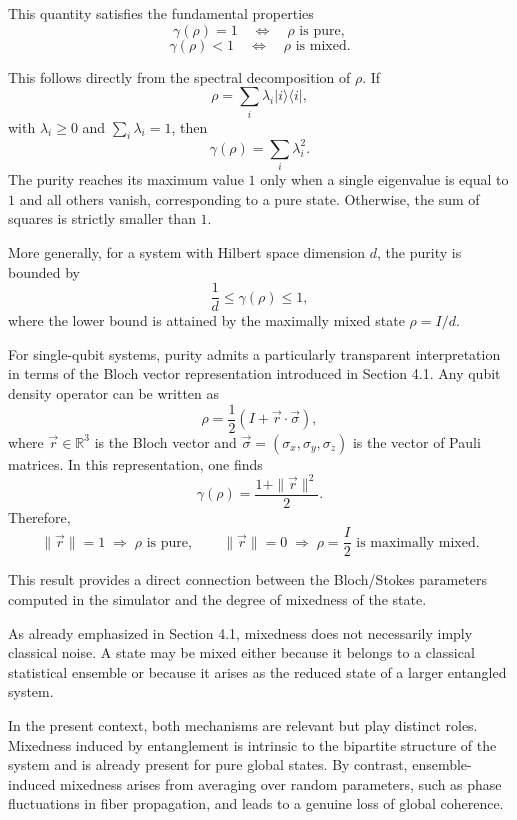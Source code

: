 \documentclass[a4paper]{article}
\begin{document}
This quantity satisfies the fundamental properties
\[
\gamma(\rho) = 1 \quad \Longleftrightarrow \quad \rho \text{ is pure},
\]
\[
\gamma(\rho) < 1 \quad \Longleftrightarrow \quad \rho \text{ is mixed}.
\]

This follows directly from the spectral decomposition of $\rho$. If
\[
\rho = \sum_i \lambda_i |i\rangle \langle i|,
\]
with $\lambda_i \ge 0$ and $\sum_i \lambda_i = 1$, then
\[
\gamma(\rho) = \sum_i \lambda_i^2.
\]
The purity reaches its maximum value $1$ only when a single eigenvalue is equal to $1$ and all others vanish, corresponding to a pure state. Otherwise, the sum of squares is strictly smaller than $1$.

More generally, for a system with Hilbert space dimension $d$, the purity is bounded by
\[
\frac{1}{d} \le \gamma(\rho) \le 1,
\]
where the lower bound is attained by the maximally mixed state $\rho = I/d$.

\medskip

For single-qubit systems, purity admits a particularly transparent interpretation in terms of the Bloch vector representation introduced in Section 4.1. Any qubit density operator can be written as
\[
\rho = \frac{1}{2}\left(I + \vec{r} \cdot \vec{\sigma}\right),
\]
where $\vec{r} \in \mathbb{R}^3$ is the Bloch vector and $\vec{\sigma} = (\sigma_x, \sigma_y, \sigma_z)$ is the vector of Pauli matrices. In this representation, one finds
\[
\gamma(\rho) = \frac{1 + \|\vec{r}\|^2}{2}.
\]
Therefore,
\[
\|\vec{r}\| = 1 \;\Rightarrow\; \rho \text{ is pure},
\qquad
\|\vec{r}\| = 0 \;\Rightarrow\; \rho = \frac{I}{2} \text{ is maximally mixed}.
\]

This result provides a direct connection between the Bloch/Stokes parameters computed in the simulator and the degree of mixedness of the state.

\medskip

As already emphasized in Section 4.1, mixedness does not necessarily imply classical noise. A state
may be mixed either because it belongs to a classical statistical ensemble or because it arises as
the reduced state of a larger entangled system.

In the present context, both mechanisms are relevant but play distinct roles. Mixedness induced by
entanglement is intrinsic to the bipartite structure of the system and is already present for pure
global states. By contrast, ensemble-induced mixedness arises from averaging over random parameters,
such as phase fluctuations in fiber propagation, and leads to a genuine loss of global coherence.
\end{document}
